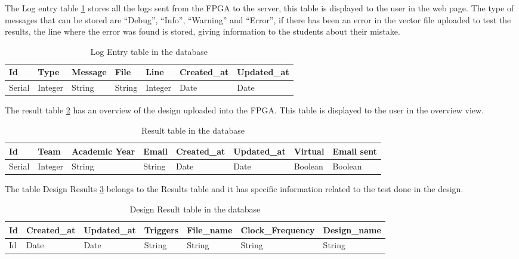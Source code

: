 The Log entry table \ref{tab:log_entry_table} stores all the logs sent from the FPGA to the server, this table is displayed to the user in the web page. The type of messages that can be stored are ``Debug'', ``Info'', ``Warning'' and ``Error'',
if there has been an error in the vector file uploaded to test the results, the line where the error was found is stored, giving information to the students about their mistake.

\begin{table}[h!]
\centering
    \begin{tabular}{ | l | l | l | l | l | l | l |}
    \hline
    Id & Type & Message & File & Line & Created\_at & Updated\_at  \\ \hline
    Serial & Integer & String & String & Integer & Date & Date \\ \hline
    \end{tabular}
    \caption{Log Entry table in the database}
    \label{tab:log_entry_table}
\end{table}

The result table \ref{tab:Result_table} has an overview of the design uploaded into the FPGA. This table is displayed to the user in the overview view. 

\begin{table}[h!]
\centering
    \begin{tabular}{ | l | l | l | l | l | l | l | l |}
    \hline
    Id & Team & Academic Year & Email & Created\_at & Updated\_at & Virtual & Email sent \\ \hline
    Serial & Integer & String & String & Date & Date & Boolean & Boolean\\ \hline
    \end{tabular}
    \caption{Result table in the database}
    \label{tab:Result_table}
\end{table}

The table Design Results \ref{tab:design_result_table} belongs to the Results table and it has specific information related to the test done in the design.

\begin{table}[h!]
\centering
    \begin{tabular}{ | l | l | l | l | l | l | l |}
    \hline
    Id & Created\_at & Updated\_at & Triggers & File\_name & Clock\_Frequency & Design\_name  \\ \hline
    Id & Date & Date & String & String & String & String \\ \hline
    \end{tabular}
    \caption{Design Result table in the database}
    \label{tab:design_result_table}
\end{table}

